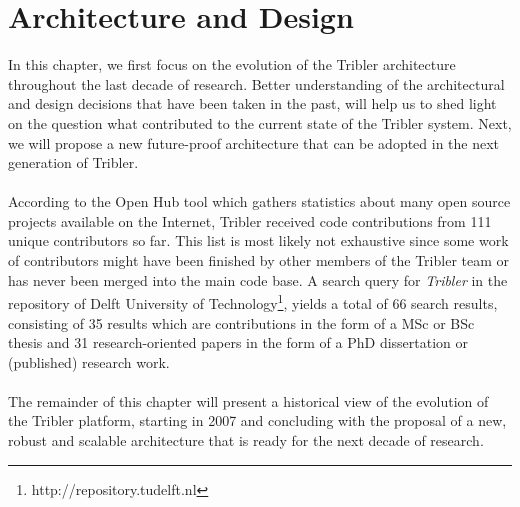 \chapter{Architecture and Design}
\label{chapter:architecture}

In this chapter, we first focus on the evolution of the Tribler architecture throughout the last decade of research. Better understanding of the architectural and design decisions that have been taken in the past, will help us to shed light on the question what contributed to the current state of the Tribler system. Next, we will propose a new future-proof architecture that can be adopted in the next generation of Tribler.\\\\
According to the Open Hub tool\cite{openhubtribler} which gathers statistics about many open source projects available on the Internet, Tribler received code contributions from 111 unique contributors so far. This list is most likely not exhaustive since some work of contributors might have been finished by other members of the Tribler team or has never been merged into the main code base. A search query for \emph{Tribler} in the repository of Delft University of Technology\footnote{http://repository.tudelft.nl}, yields a total of 66 search results, consisting of 35 results which are contributions in the form of a MSc or BSc thesis and 31 research-oriented papers in the form of a PhD dissertation or (published) research work.\\\\
The remainder of this chapter will present a historical view of the evolution of the Tribler platform, starting in 2007 and concluding with the proposal of a new, robust and scalable architecture that is ready for the next decade of research.

